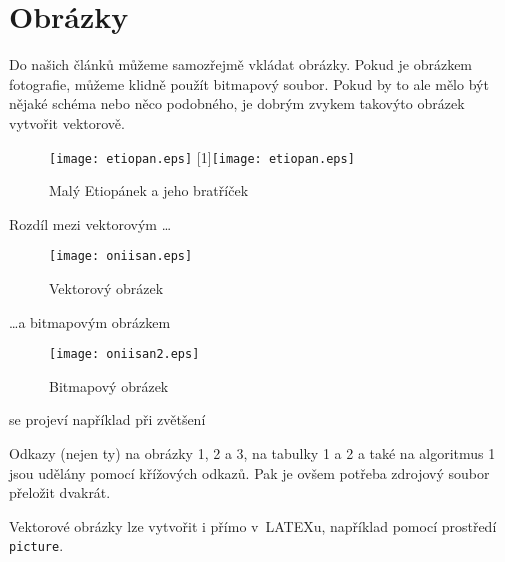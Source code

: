 \documentclass[a4paper, 11pt]{article}
\begin{document}
\section{Obrázky}
Do našich článků můžeme samozřejmě vkládat obrázky. Pokud je obrázkem fotografie,
můžeme klidně použít bitmapový soubor. Pokud by to ale mělo být nějaké schéma nebo
něco podobného, je dobrým zvykem takovýto obrázek vytvořit vektorově.

\begin{figure}[h]
    \centering
    \texttt{[image: etiopan.eps]}
    \vspace{0mm}
    \scalebox{-1}[1]{\texttt{[image: etiopan.eps]}}
    \caption{Malý Etiopánek a jeho bratříček}
    \label{Etiopánek}
\end{figure}

\newpage

\noindent Rozdíl mezi vektorovým \dots

\begin{figure}[h]
    \centering
    \texttt{[image: oniisan.eps]}
    \caption{Vektorový obrázek}
    \label{vektorový obrázek}
\end{figure}

\noindent\dots a bitmapovým obrázkem

\begin{figure}[h]
    \centering
    \texttt{[image: oniisan2.eps]}
    \caption{Bitmapový obrázek}
    \label{bitmapový obrázek}
\end{figure}


\noindent se projeví například při zvětšení
\par
Odkazy (nejen ty) na obrázky 1, 2 a 3, na  
tabulky 1 a 2 a také na algoritmus 1 jsou udělány pomocí 
křížových odkazů. Pak je ovšem potřeba zdrojový soubor přeložit dvakrát.
\par
Vektorové obrázky lze vytvořit i přímo v~LATEXu, například pomocí prostředí \verb!picture!.
\end{document}

